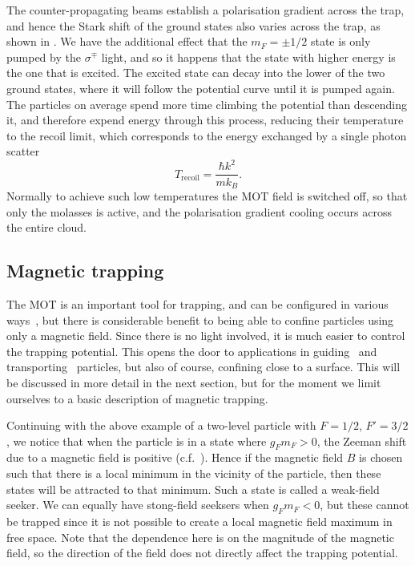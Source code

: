 The counter-propagating beams establish a polarisation gradient across the
trap, and hence the Stark shift of the ground states also varies across the
trap, as shown in \myfigref{}. We have the additional effect that the
$m_F=\pm1/2$ state is only pumped by the $\sigma^\mp$ light, and so it happens
that the state with higher energy is the one that is excited. The excited state
can decay into the lower of the two ground states, where it will follow the
potential curve until it is pumped again. The particles on average spend more
time climbing the potential than descending it, and therefore expend energy
through this process, reducing their temperature to the recoil limit, which
corresponds to the energy exchanged by a single photon scatter
%
\begin{equation}
  T_\text{recoil} = \frac{\hbar k^2}{m k_B}.
\end{equation}
%
Normally to achieve such low temperatures the MOT field is switched off,
so that only the molasses is active, and the polarisation gradient cooling
occurs across the entire cloud.

\subsection{Magnetic trapping}

The MOT is an important tool for trapping, and can be configured in various
ways~\cite{Cotter2016, Lee:96, PhysRevLett.59.2631}, but there is considerable
benefit to being able to confine particles using only a magnetic field. Since
there is no light involved, it is much easier to control the trapping
potential. This opens the door to applications in
guiding~\cite{PhysRevLett.83.5194} and transporting~\cite{Nakagawa2005}
particles, but also of course, confining close to a surface. This will be
discussed in more detail in the next section, but for the moment we limit
ourselves to a basic description of magnetic trapping.

Continuing with the above example of a two-level particle with $F=1/2$,
$F'=3/2$, we notice that when the particle is in a state where $g_F m_F > 0$,
the Zeeman shift due to a magnetic field is positive (c.f.\
). Hence if the magnetic field $B$ is chosen such
that there is a local minimum in the vicinity of the particle, then these
states will be attracted to that minimum. Such a state is called a weak-field
seeker. We can equally have stong-field seeksers when $g_F m_F < 0$, but these
cannot be trapped since it is not possible to create a local magnetic field
maximum in free space.
%
Note that the dependence here is on the magnitude of the magnetic field, so the
direction of the field does not directly affect the trapping potential.

